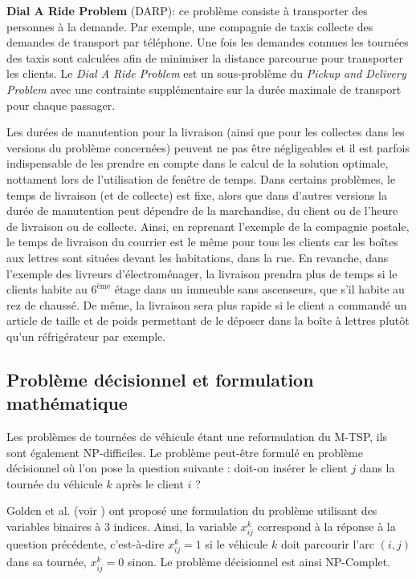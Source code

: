 \begin{list}{-}{\leftmargin=2em}
  \item \textbf{Dial A Ride Problem} (DARP): ce problème consiste à transporter des personnes à la demande. Par exemple, une compagnie de taxis collecte des demandes de transport par téléphone. Une fois les demandes connues les tournées des taxis sont calculées afin de minimiser la distance parcourue pour transporter les clients. Le \textit{Dial A Ride Problem} est un sous-problème du \textit{Pickup and Delivery Problem} avec une contrainte supplémentaire sur la durée maximale de transport pour chaque passager.
\end{list}

Les durées de manutention pour la livraison (ainsi que pour les collectes dans les versions du problème concernées) peuvent ne pas être négligeables et il est parfois indispensable de les prendre en compte dans le calcul de la solution optimale, nottament lors de l'utilisation de fenêtre de temps. Dans certains problèmes, le temps de livraison (et de collecte) est fixe, alors que dans d'autres versions la durée de manutention peut dépendre de la marchandise, du client ou de l'heure de livraison ou de collecte. Ainsi, en reprenant l'exemple de la compagnie postale, le temps de livraison du courrier est le même pour tous les clients car les boîtes aux lettres sont situées devant les habitations, dans la rue. En revanche, dans l'exemple des livreurs d'électroménager, la livraison prendra plus de temps si le clients habite au $6^{\text{ème}}$ étage dans un immeuble sans ascenseurs, que s'il habite au rez de chaussé. De même, la livraison sera plus rapide si le client a commandé un article de taille et de poids 
permettant de le déposer dans la boîte à lettres plutôt qu'un réfrigérateur par exemple.

\subsection{Problème décisionnel et formulation mathématique}\label{sec:vrp:modelMath}

Les problèmes de tournées de véhicule étant une reformulation du M-TSP, ils sont également NP-difficiles. Le problème peut-être formulé en problème décisionnel où l'on pose la question suivante : doit-on insérer le client $j$ dans la tournée du véhicule $k$ après le client $i$ ?

Golden et al. (voir \cite{Golden1977}) ont proposé une formulation du problème utilisant des variables binaires à 3 indices. Ainsi, la variable $x_{ij}^k$ correspond à la réponse à la question précédente, c'est-à-dire $x_{ij}^k=1$ si le véhicule $k$ doit parcourir l'arc $(i,j)$ dans sa tournée, $x_{ij}^k=0$ sinon. Le problème décisionnel est ainsi NP-Complet.

